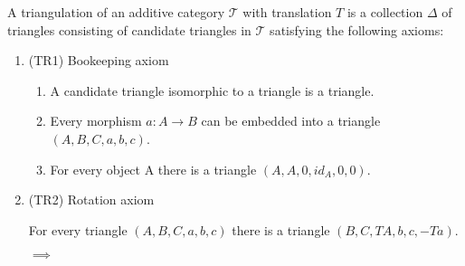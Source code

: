     \begin{definition}
        A triangulation of an additive category $\mathcal{T}$ with translation $T$ is a collection $\Delta$ of triangles consisting of candidate triangles in $\mathcal{T}$ satisfying the following axioms: 

        \begin{enumerate}
            \item (TR1) Bookeeping axiom

                \begin{enumerate}
                    \item A candidate triangle isomorphic to a triangle is a triangle.
                    \item Every morphism $a : A \rightarrow B$ can be embedded into a triangle $(A,B,C,a,b,c)$.
                    \begin{center}
                    \end{center}
                    \item For every object A there is a triangle $(A,A,0,id_A,0,0)$.
                    \begin{center}
                    \end{center}
                \end{enumerate}
            \item (TR2) Rotation axiom

                For every triangle $(A,B,C,a,b,c)$ there is a triangle $(B,C,TA,b,c,-Ta)$.
                \begin{center}
                     $\implies$
                    

\end{center}
\end{enumerate}
\end{definition}
